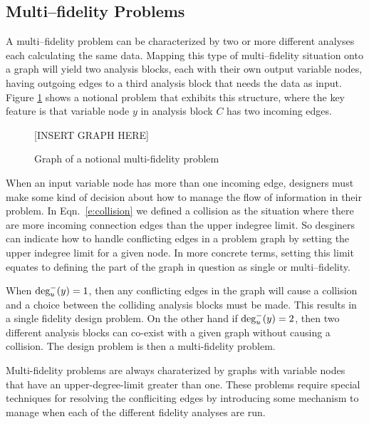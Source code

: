 \subsection{Multi--fidelity Problems}
	\label{ss:multi-fideliy problems}
	A multi--fidelity problem can be characterized by two or more different analyses 
	each calculating the same data. Mapping this type of multi--fidelity situation 
	onto a graph will yield two analysis blocks, each with their own output 
	variable nodes, having outgoing edges to a third analysis block that needs the 
	data as input. Figure \ref{f:collision-example} shows a notional problem 
	that exhibits this structure, where the key feature is that variable node $y$ in 
	analysis block $C$ has two incoming edges. 
	\begin{figure}
	  \begin{center}
	  [INSERT GRAPH HERE]
	  \caption{Graph of a notional multi-fidelity problem \label{f:collision-example}}
	  \end{center}
	\end{figure}

	When an input variable node has more than one incoming edge, designers must make
	some kind of decision about how to manage the flow of information in their problem. 
	In Eqn.~\ref{e:collision} we defined a collision as the situation where
	there are more incoming connection edges than the upper indegree limit. So desginers can
	indicate how to handle conflicting edges in a problem graph by setting the upper indegree limit
	for a given node. In more concrete terms, setting this limit equates to defining 
	the part of the graph in question as single or multi--fidelity. 

	When $\textrm{deg}_u^-(y)=1$, then any conflicting edges in the graph will cause a collision
	and a choice between the colliding analysis blocks must be made. This results in a 
	single fidelity design problem. On the other hand if $\textrm{deg}_u^-(y)=2$, then two 
	different analysis blocks can co-exist with a given graph without causing a 
	collision. The design problem is then a multi-fidelity problem.

	Multi-fidelity problems are always charaterized by graphs with variable 
	nodes that have an upper-degree-limit greater than one. These problems require 
	special techniques for resolving the confliciting edges by introducing some mechanism
	to manage when each of the different fidelity analyses are 
	run\cite{march2012provably,alexandrov2001approximation,Huang_Allen_Notz_Miller_2006}.


